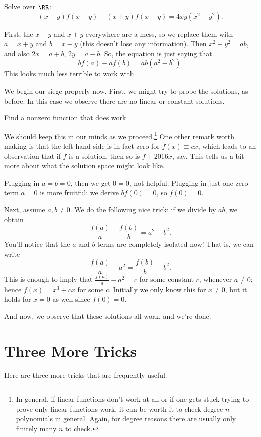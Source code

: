 \documentclass[11pt]{scrartcl}
\begin{document}
\begin{example}[Singapore 1999]
  \label{ex:singapore}
  Solve over $\RR$:
  \[ (x-y)f(x+y) - (x+y)f(x-y) = 4xy(x^2-y^2). \]
\end{example}
\begin{soln}
  First, the $x-y$ and $x+y$ everywhere are a mess,
  so we replace them with $a = x+y$ and $b = x-y$ (this doesn't lose any information).
  Then $x^2-y^2 = ab$, and also $2x = a+b$, $2y = a-b$.
  So, the equation is just saying that
  \[ bf(a) - af(b) = ab(a^2-b^2). \]
  This looks much less terrible to work with.

  We begin our siege properly now.
  First, we might try to probe the solutions, as before.
  In this case we observe there are no linear or constant solutions.
  \begin{exercise}
    Find a nonzero function that does work.
  \end{exercise}
  We should keep this in our minds as we proceed.\footnote{%
    In general, if linear functions don't work at all
    or if one gets stuck trying to prove only linear functions work,
    it can be worth it to check degree $n$ polynomials in general.
    Again, for degree reasons there are usually only finitely many $n$ to check.}
  One other remark worth making is that the left-hand side is in fact zero
  for $f(x) \equiv cx$, which leads to an observation that
  if $f$ is a solution, then so is $f+2016x$, say.
  This tells us a bit more about what the solution space might look like.

  Plugging in $a=b=0$, then we get $0=0$, not helpful.
  Plugging in just one zero term $a=0$ is more fruitful: we derive
  $bf(0) = 0$, so $f(0) = 0$.

  Next, assume $a,b \neq 0$.
  We do the following nice trick:
  if we divide by $ab$, we obtain
  \[ \frac{f(a)}{a} - \frac{f(b)}{b} = a^2 - b^2. \]
  You'll notice that the $a$ and $b$ terms are completely isolated now!
  That is, we can write
  \[ \frac{f(a)}{a} - a^2 = \frac{f(b)}{b} - b^2. \]
  This is enough to imply that $\frac{f(a)}{a} - a^2 = c$ for some constant $c$,
  whenever $a \neq 0$; hence $f(x) = x^3 + cx$ for some $c$.
  Initially we only know this for $x \neq 0$,
  but it holds for $x=0$ as well since $f(0) = 0$.

  And now, we observe that these solutions all work, and we're done.
\end{soln}

\section{Three More Tricks}
Here are three more tricks that are frequently useful.
\end{document}
